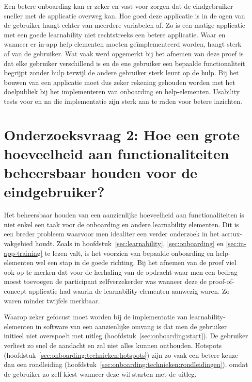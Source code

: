 Een betere onboarding kan er zeker en vast voor zorgen dat de eindgebruiker sneller met de applicatie overweg kan. Hoe goed deze applicatie is in de ogen van de gebruiker hangt echter van meerdere variabelen af. Zo is een matige applicatie met een goede learnability niet rechtstreeks een betere applicatie. Waar en wanneer er in-app help elementen moeten geïmplementeerd worden, hangt sterk af van de gebruiker. Wat vaak werd opgemerkt bij het afnemen van deze proef is dat elke gebruiker verschillend is en de ene gebruiker een bepaalde functionaliteit begrijpt zonder hulp terwijl de andere gebruiker sterk leunt op de hulp. Bij het bouwen van een applicatie moet dus zeker rekening gehouden worden met het doelpubliek bij het implementeren van onboarding en help-elementen. Usability tests voor en na die implementatie zijn sterk aan te raden voor betere inzichten.

\section[Onderzoeksvraag 2]{Onderzoeksvraag 2: Hoe een grote hoeveelheid aan functionaliteiten beheersbaar houden voor de eindgebruiker?}
\label{sec:onderzoeksvraag-2}

Het beheersbaar houden van een aanzienlijke hoeveelheid aan functionaliteiten is niet enkel een taak voor de onboarding en andere learnability elementen. Dit is een breder probleem waarvoor men idealiter een verder onderzoek in het \acrshort{acr:ux}-vakgebied houdt. Zoals in hoofdstuk~\ref{sec:learnability}, \ref{sec:onboarding} en \ref{sec:in-app-training} te lezen valt, is het voorzien van bepaalde onboarding en help-elementen wel een stap in de goede richting. Bij het afnemen van de proef viel ook op te merken dat voor de herhaling van de opdracht waar men een bedrag moest toevoegen de participant zelfverzekerder was wanneer deze de proof-of-concept applicatie had waarin de learnability-elementen aanwezig waren. Zo waren minder twijfels merkbaar.

Waarop zeker gefocust moet worden bij de implementatie van learnability-elementen in software van een aanzienlijke omvang is dat men de gebruiker initieel niet overspoelt met uitleg (hoofdstuk~\ref{sec:onboarding:start}). De gebruiker verliest zo snel de aandacht en zal niet alles kunnen onthouden. Hotspots (hoofdstuk~\ref{sec:onboarding:technieken:hotspots}) zijn zo vaak een betere keuze dan een rondleiding (hoofdstuk~\ref{sec:onboarding:technieken:rondleidingen}), omdat de gebruiker zo zelf kiest wanneer deze wil starten met de uitleg.

